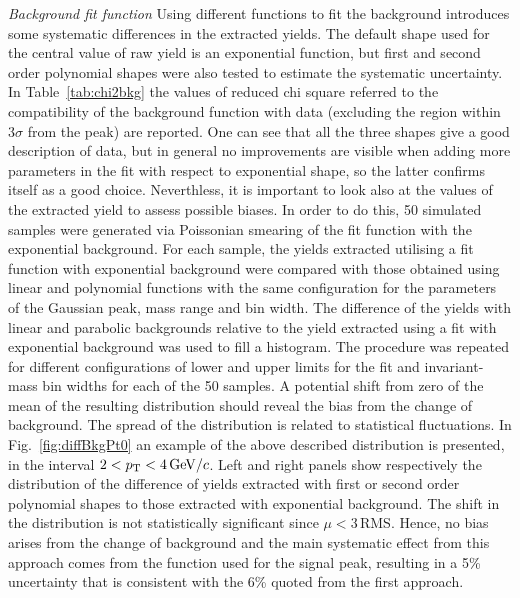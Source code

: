 \emph{Background fit function}
Using different functions to fit the background introduces 
some systematic differences in the extracted yields.
The default shape used for the central value of raw yield is an 
exponential function, but first and second 
order polynomial shapes were also tested to estimate the systematic 
uncertainty. In Table~\ref{tab:chi2bkg} 
the values of reduced chi square referred to the compatibility 
of the background function with data (excluding the region within 3$\sigma$ from the peak) are 
reported. One can see that all the three shapes 
give a good description of data, but in general no improvements 
are visible when adding more parameters in the fit
with respect to exponential shape, so the latter confirms itself as a good choice.
Neverthless, it is important to look also at the values of the 
extracted yield to assess possible biases.
 In order to do this, 50 simulated samples were generated via 
 Poissonian smearing of the fit function with the exponential background.
 For each sample, the yields extracted utilising a fit function with exponential 
 background were compared with those obtained using linear and 
 polynomial functions with the same
configuration for the parameters of the Gaussian peak, mass range and bin width. The
difference of the yields with linear and parabolic backgrounds relative to 
the yield extracted using a fit with exponential background 
was used to fill a histogram. The procedure was repeated for different
configurations of lower and upper limits for the fit and 
invariant-mass bin widths for each of the
50 samples. 
A potential shift from zero of the mean of the resulting distribution 
 should reveal the bias from the change of background. The
  spread of the distribution is related to statistical fluctuations. 
  In Fig.~\ref{fig:diffBkgPt0} an example of the above 
  described distribution is presented, in the interval $2 < p_{\rm T} < 4\, \mathrm{GeV}/c$.
  Left and right panels show respectively the distribution of the difference
  of yields extracted with first or second order polynomial shapes to those extracted with exponential
  background. The shift in the distribution is not statistically significant 
 since $\mu < 3\,$RMS. Hence, no bias arises from the change of background
 and the main systematic effect from this approach comes from the function used for the 
 signal peak, resulting in a 5\% uncertainty that is consistent with the 6\% quoted from the first approach.\\
 
